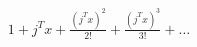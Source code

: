 \documentclass[preview]{standalone}
\begin{document}
\begin{align*}
1 + j^T x + \frac{(j^T x)^2}{2!} + \frac{(j^T x)^3}{3!} + \dots
\end{align*}
\end{document}
